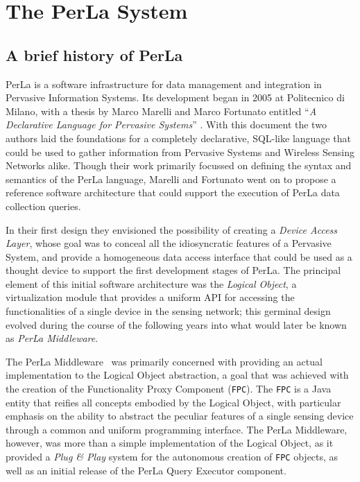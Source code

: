 \chapter{The PerLa System}
\label{cha:perlasystem}

\section{A brief history of PerLa}

PerLa is a software infrastructure for data management and integration in
Pervasive Information Systems. Its development began in 2005 at Politecnico di
Milano, with a thesis by Marco Marelli and Marco Fortunato entitled ``\textit{A
Declarative Language for Pervasive Systems}'' \cite{mm_thesis}. With this
document the two authors laid the foundations for a completely declarative,
SQL-like language that could be used to gather information from Pervasive
Systems and Wireless Sensing Networks alike. Though their work primarily
focussed on defining the syntax and semantics of the PerLa language, Marelli
and Fortunato went on to propose a reference software architecture that could
support the execution of PerLa data collection queries.

In their first design they envisioned the possibility of creating a
\textit{Device Access Layer}, whose goal was to conceal all the idiosyncratic
features of a Pervasive System, and provide a homogeneous data access interface
that could be used as a thought device to support the first development stages
of PerLa. The principal element of this initial software architecture was the
\textit{Logical Object}, a virtualization module that provides a uniform API
for accessing the functionalities of a single device in the sensing network;
this germinal design evolved during the course of the following years
into what would later be known as \textit{PerLa Middleware}. 

The PerLa Middleware~\cite{tse_perla} was primarily concerned with providing an
actual implementation to the Logical Object abstraction, a goal that was
achieved with the creation of the Functionality Proxy Component (\texttt{FPC}).
The \texttt{FPC} is a Java entity that reifies all concepts embodied by the
Logical Object, with particular emphasis on the ability to abstract the
peculiar features of a single sensing device through a common and uniform
programming interface. The PerLa Middleware, however, was more than a simple
implementation of the Logical Object, as it provided a \textit{Plug \& Play}
system for the autonomous creation of \texttt{FPC} objects, as well as an
initial release of the PerLa Query Executor component.

